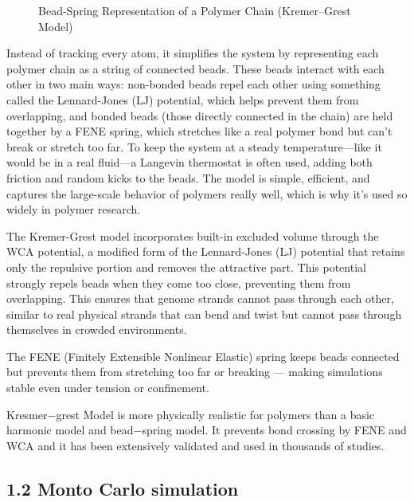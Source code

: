 \documentclass[12pt]{article}
\begin{document}
\begin{flushleft}
\begin{figure}[!ht]
  \centering
  \caption{Bead-Spring Representation of a Polymer Chain (Kremer–Grest Model)}
\end{figure}


Instead of tracking every atom, it simplifies the system by representing each polymer chain as a string of connected beads. These beads interact with each other in two main ways: non-bonded beads repel each other using something called the Lennard-Jones (LJ) potential, which helps prevent them from overlapping, and bonded beads (those directly connected in the chain) are held together by a FENE spring, which stretches like a real polymer bond but can't break or stretch too far. To keep the system at a steady temperature—like it would be in a real fluid—a Langevin thermostat is often used, adding both friction and random kicks to the beads. The model is simple, efficient, and captures the large-scale behavior of polymers really well, which is why it's used so widely in polymer research.	



The Kremer-Grest model incorporates built-in excluded volume through the WCA potential, a modified form of the Lennard-Jones (LJ) potential that retains only the repulsive portion and removes the attractive part. This potential strongly repels beads when they come too close, preventing them from overlapping. This ensures that genome strands cannot pass through each other, similar to real physical strands that can bend and twist but cannot pass through themselves in crowded environments.

The FENE (Finitely Extensible Nonlinear Elastic) spring keeps beads connected but prevents them from stretching too far or breaking — making simulations stable even under tension or confinement.
	

Kresmer$-$grest Model is more physically realistic for polymers than a basic harmonic model and bead$-$spring model.
It prevents bond crossing by FENE and WCA and it has been extensively validated and used in thousands of studies.







\subsection*{1.2 Monto Carlo simulation}


\end{flushleft}
\end{document}
